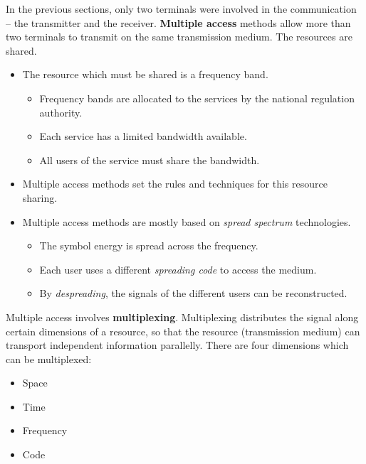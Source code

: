 \begin{refsection}
In the previous sections, only two terminals were involved in the communication -- the transmitter and the receiver.  \textbf{Multiple access} methods allow more than two terminals to transmit on the same transmission medium. The resources are shared.
\begin{itemize}
	\item The resource which must be shared is a frequency band.
	\begin{itemize}
		\item Frequency bands are allocated to the services by the national regulation authority.
		\item Each service has a limited bandwidth available.
		\item All users of the service must share the bandwidth.
	\end{itemize}
	\item Multiple access methods set the rules and techniques for this resource sharing.
	\item Multiple access methods are mostly based on \emph{spread spectrum} technologies.
	\begin{itemize}
		\item The symbol energy is spread across the frequency.
		\item Each user uses a different \emph{spreading code} to access the medium.
		\item By \emph{despreading}, the signals of the different users can be reconstructed.
	\end{itemize}
\end{itemize}

Multiple access involves  \textbf{multiplexing}. Multiplexing distributes the signal along certain dimensions of a resource, so that the resource (transmission medium) can transport independent information parallelly. There are four dimensions which can be multiplexed:
\begin{itemize}
	\item Space
	\item Time
	\item Frequency
	\item Code
\end{itemize}


\end{refsection}
